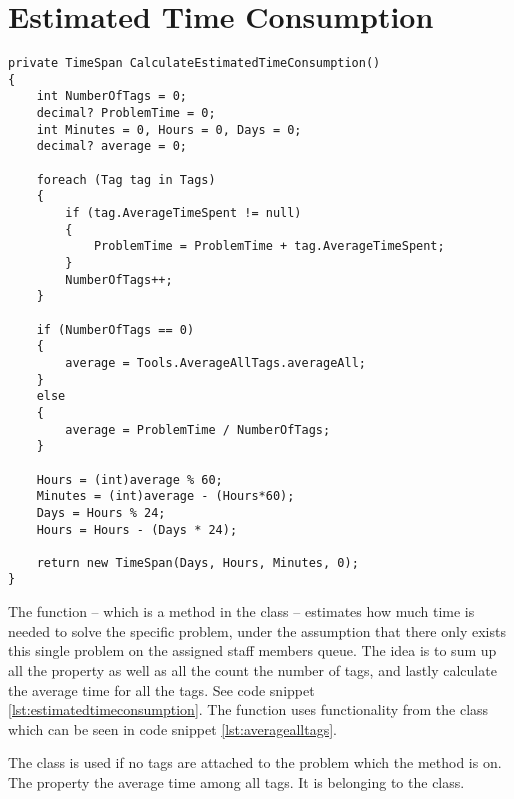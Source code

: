 \section{Estimated Time Consumption}
\label{sec:estimated_time_consumption}



\begin{lstlisting}[style=sourceCode, caption=\myCaption{The ManageTagTimes method. In lines one to seven a property is shown, which wraps the method in lines nine to forty-three}, label=lst:estimatedtimeconsumption,float=hp]
private TimeSpan CalculateEstimatedTimeConsumption()
{
    int NumberOfTags = 0;
    decimal? ProblemTime = 0;
    int Minutes = 0, Hours = 0, Days = 0;
    decimal? average = 0;
    
    foreach (Tag tag in Tags)
    {
        if (tag.AverageTimeSpent != null)
        {
            ProblemTime = ProblemTime + tag.AverageTimeSpent;
        }
        NumberOfTags++;
    }

    if (NumberOfTags == 0)
    {
        average = Tools.AverageAllTags.averageAll;
    }
    else
    {
        average = ProblemTime / NumberOfTags;
    }

    Hours = (int)average % 60;
    Minutes = (int)average - (Hours*60);
    Days = Hours % 24;
    Hours = Hours - (Days * 24);

    return new TimeSpan(Days, Hours, Minutes, 0);
}
\end{lstlisting}


The  function -- which is a method in the  class -- estimates how much time is needed to solve the specific problem, under the assumption that there only exists this single problem on the assigned staff members queue. The idea is to sum up all the  property as well as all the count the number of tags, and lastly calculate the average time for all the tags. See code snippet \ref{lst:estimatedtimeconsumption}. The  function uses functionality from the  class which can be seen in code snippet \ref{lst:averagealltags}.

The  class is used if no tags are attached to the problem which the  method is on.
The property  the average time among all tags.
It is belonging to the  class.

